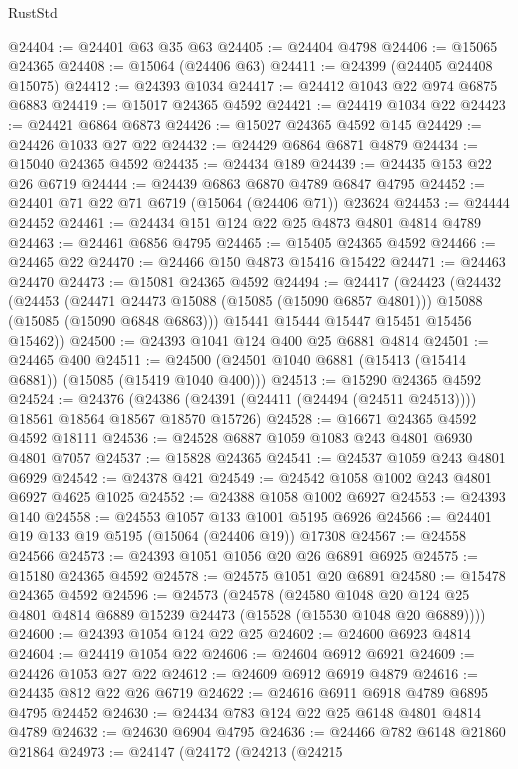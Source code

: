 \begin{lexlean}{RustStd}
\begin{coremodule}
@24404 := @24401 @63 @35 @63
@24405 := @24404 @4798
@24406 := @15065 @24365
@24408 := @15064 (@24406 @63)
@24411 := @24399 (@24405 @24408 @15075)
@24412 := @24393 @1034
@24417 := @24412 @1043 @22 @974 @6875 @6883
@24419 := @15017 @24365 @4592
@24421 := @24419 @1034 @22
@24423 := @24421 @6864 @6873
@24426 := @15027 @24365 @4592 @145
@24429 := @24426 @1033 @27 @22
@24432 := @24429 @6864 @6871 @4879
@24434 := @15040 @24365 @4592
@24435 := @24434 @189
@24439 := @24435 @153 @22 @26 @6719
@24444 := @24439 @6863 @6870 @4789 @6847 @4795
@24452 := @24401 @71 @22 @71 @6719 (@15064 (@24406 @71)) @23624
@24453 := @24444 @24452
@24461 := @24434 @151 @124 @22 @25 @4873 @4801 @4814 @4789
@24463 := @24461 @6856 @4795
@24465 := @15405 @24365 @4592
@24466 := @24465 @22
@24470 := @24466 @150 @4873 @15416 @15422
@24471 := @24463 @24470
@24473 := @15081 @24365 @4592
@24494 := @24417
    (@24423
      (@24432
        (@24453
          (@24471 @24473 @15088 (@15085 (@15090 @6857 @4801)))
          @15088
          (@15085 (@15090 @6848 @6863)))
        @15441
        @15444
        @15447
        @15451
        @15456
        @15462))
@24500 := @24393 @1041 @124 @400 @25 @6881 @4814
@24501 := @24465 @400
@24511 := @24500 (@24501 @1040 @6881 (@15413 (@15414 @6881)) (@15085 (@15419 @1040 @400)))
@24513 := @15290 @24365 @4592
@24524 := @24376
    (@24386 (@24391 (@24411 (@24494 (@24511 @24513)))) @18561 @18564 @18567 @18570 @15726)
@24528 := @16671 @24365 @4592 @4592 @18111
@24536 := @24528 @6887 @1059 @1083 @243 @4801 @6930 @4801 @7057
@24537 := @15828 @24365
@24541 := @24537 @1059 @243 @4801 @6929
@24542 := @24378 @421
@24549 := @24542 @1058 @1002 @243 @4801 @6927 @4625 @1025
@24552 := @24388 @1058 @1002 @6927
@24553 := @24393 @140
@24558 := @24553 @1057 @133 @1001 @5195 @6926
@24566 := @24401 @19 @133 @19 @5195 (@15064 (@24406 @19)) @17308
@24567 := @24558 @24566
@24573 := @24393 @1051 @1056 @20 @26 @6891 @6925
@24575 := @15180 @24365 @4592
@24578 := @24575 @1051 @20 @6891
@24580 := @15478 @24365 @4592
@24596 := @24573
    (@24578
      (@24580 @1048 @20 @124 @25 @4801 @4814 @6889 @15239 @24473 (@15528 (@15530 @1048 @20 @6889))))
@24600 := @24393 @1054 @124 @22 @25
@24602 := @24600 @6923 @4814
@24604 := @24419 @1054 @22
@24606 := @24604 @6912 @6921
@24609 := @24426 @1053 @27 @22
@24612 := @24609 @6912 @6919 @4879
@24616 := @24435 @812 @22 @26 @6719
@24622 := @24616 @6911 @6918 @4789 @6895 @4795 @24452
@24630 := @24434 @783 @124 @22 @25 @6148 @4801 @4814 @4789
@24632 := @24630 @6904 @4795
@24636 := @24466 @782 @6148 @21860 @21864
@24973 := @24147
    (@24172
      (@24213
        (@24215

\end{coremodule}
\end{lexlean}
